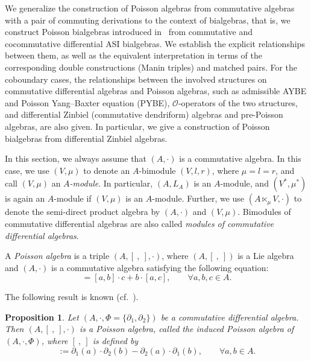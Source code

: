 \documentclass[pdftex]{sigma}
\numberwithin{equation}{section}
\newtheorem{Proposition}[Theorem]{Proposition}
{ \theoremstyle{definition}
	\newtheorem{Definition}[Theorem]{Definition}
	\newtheorem{Note}[Theorem]{Note}
	\newtheorem{Example}[Theorem]{Example}
	\newtheorem{Remark}[Theorem]{Remark} }
\begin{document}
We generalize the construction of Poisson algebras from commutative algebras with a pair of commuting derivations to the context of bialgebras,
that is, we construct Poisson bialgebras introduced in~\cite{ni2013poisson} from commutative and cocommutative differential ASI bialgebras.
We establish the explicit relationships between them, as well as the equivalent interpretation in terms of the corresponding double constructions (Manin triples) and matched pairs.
For the coboundary cases, the relationships between the involved structures on commutative differential algebras and Poisson algebras,
such as admissible AYBE and Poisson Yang--Baxter equation (PYBE), $\mathcal{O}$-operators of the two structures, and differential Zinbiel (commutative dendriform) algebras and pre-Poisson algebras, are also given.
In particular, we give a construction of Poisson bialgebras from differential Zinbiel algebras.


In this section, we always assume that $(A, \cdot)$ is a commutative algebra.
In this case, we use $(V, \mu)$ to denote an $A$-bimodule $(V,l,r)$,
where $\mu = l = r$, and call $(V, \mu)$ an \textit{$A$-module}.
In particular, $(A, L_A)$ is an $A$-module, and $(V^*, \mu^*)$ is again an $A$-module if $(V, \mu)$ is an $A$-module.
Further, we use $(A \ltimes_\mu V, \cdot)$ to denote the semi-direct product algebra by $(A, \cdot)$ and $(V, \mu)$.
Bimodules of commutative differential algebras are also called \textit{modules of commutative differential algebras}.


\begin{Definition}
 A \textit{Poisson algebra} is a triple $(A, [\ ,\ ], \cdot)$, where $(A, [\ ,\ ])$ is a Lie algebra and $(A, \cdot)$ is a commutative algebra satisfying the following equation:
 \begin{equation*}
 [a, b \cdot c] = [a, b] \cdot c + b \cdot [a, c], \qquad
 \forall a, b, c \in A.
 \end{equation*}
\end{Definition}

The following result is known (cf.~\cite{BV1}).

\begin{Proposition}
 Let $(A, \cdot, \Phi = \{\partial_1, \partial_2\})$ be a commutative differential algebra.
 Then $(A, [\ ,\ ], \cdot)$ is a Poisson algebra,
 called the \textit{induced Poisson algebra of $(A, \cdot, \Phi)$},
 where $[\ ,\ ]$ is defined by
 \begin{equation}
 [a, b] := \partial_1(a) \cdot \partial_2(b) - \partial_2(a) \cdot \partial_1(b), \qquad
 \forall a, b \in A. \label{eq:lie}
 \end{equation}
\end{Proposition}
\end{document}
